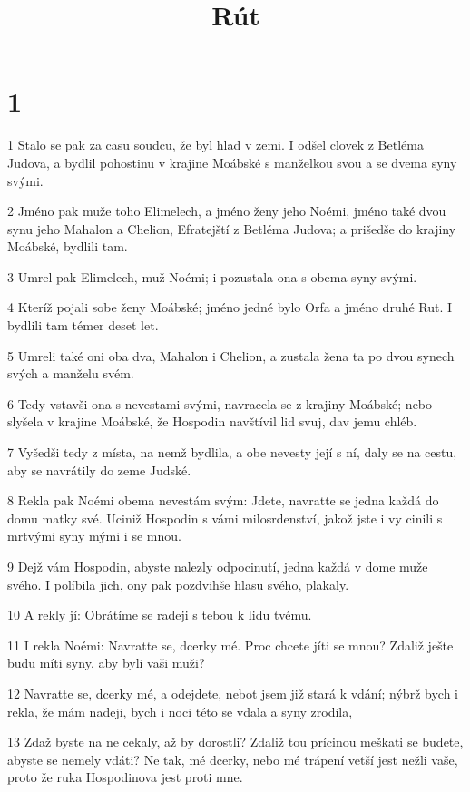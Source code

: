 

\title{Rút}

\chapter{1}

\par 1 Stalo se pak za casu soudcu, že byl hlad v zemi. I odšel clovek z Betléma Judova, a bydlil pohostinu v krajine Moábské s manželkou svou a se dvema syny svými.
\par 2 Jméno pak muže toho Elimelech, a jméno ženy jeho Noémi, jméno také dvou synu jeho Mahalon a Chelion, Efratejští z Betléma Judova; a prišedše do krajiny Moábské, bydlili tam.
\par 3 Umrel pak Elimelech, muž Noémi; i pozustala ona s obema syny svými.
\par 4 Kteríž pojali sobe ženy Moábské; jméno jedné bylo Orfa a jméno druhé Rut. I bydlili tam témer deset let.
\par 5 Umreli také oni oba dva, Mahalon i Chelion, a zustala žena ta po dvou synech svých a manželu svém.
\par 6 Tedy vstavši ona s nevestami svými, navracela se z krajiny Moábské; nebo slyšela v krajine Moábské, že Hospodin navštívil lid svuj, dav jemu chléb.
\par 7 Vyšedši tedy z místa, na nemž bydlila, a obe nevesty její s ní, daly se na cestu, aby se navrátily do zeme Judské.
\par 8 Rekla pak Noémi obema nevestám svým: Jdete, navratte se jedna každá do domu matky své. Uciniž Hospodin s vámi milosrdenství, jakož jste i vy cinili s mrtvými syny mými i se mnou.
\par 9 Dejž vám Hospodin, abyste nalezly odpocinutí, jedna každá v dome muže svého. I políbila jich, ony pak pozdvihše hlasu svého, plakaly.
\par 10 A rekly jí: Obrátíme se radeji s tebou k lidu tvému.
\par 11 I rekla Noémi: Navratte se, dcerky mé. Proc chcete jíti se mnou? Zdaliž ješte budu míti syny, aby byli vaši muži?
\par 12 Navratte se, dcerky mé, a odejdete, nebot jsem již stará k vdání; nýbrž bych i rekla, že mám nadeji, bych i noci této se vdala a syny zrodila,
\par 13 Zdaž byste na ne cekaly, až by dorostli? Zdaliž tou prícinou meškati se budete, abyste se nemely vdáti? Ne tak, mé dcerky, nebo mé trápení vetší jest nežli vaše, proto že ruka Hospodinova jest proti mne.
